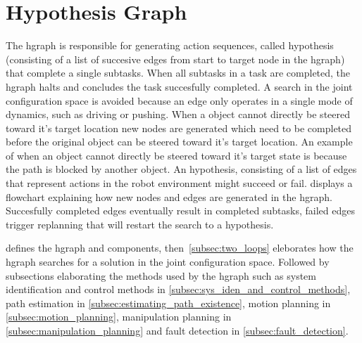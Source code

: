 \section{Hypothesis Graph}%
\label{sec:hgraph}
The \ac{hgraph} is responsible for generating action sequences, called hypothesis (consisting of a list of succesive edges from start to target node in the \ac{hgraph}) that complete a single subtasks. When all subtasks in a task are completed, the \ac{hgraph} halts and concludes the task succesfully completed. A search in the joint configuration space is avoided because an edge only operates in a single mode of dynamics, such as driving or pushing. When a object cannot directly be steered toward it's target location new nodes are generated which need to be completed before the original object can be steered toward it's target location. An example of when an object cannot directly be steered toward it's target state is because the path is blocked by another object. An hypothesis, consisting of a list of edges that represent actions in the robot environment might succeed or fail.  displays a flowchart explaining how new nodes and edges are generated in the \ac{hgraph}. Succesfully completed edges eventually result in completed subtasks, failed edges trigger replanning that will restart the search to a hypothesis.\bs

 defines the \ac{hgraph} and components, then~\cref{subsec:two_loops} eleborates how the \ac{hgraph} searches for a solution in the joint configuration space. Followed by subsections elaborating the methods used by the \ac{hgraph} such as system identification and control methods in \cref{subsec:sys_iden_and_control_methods}, path estimation in \cref{subsec:estimating_path_existence}, motion planning in \cref{subsec:motion_planning}, manipulation planning in \cref{subsec:manipulation_planning} and fault detection in \cref{subsec:fault_detection}.\bs

